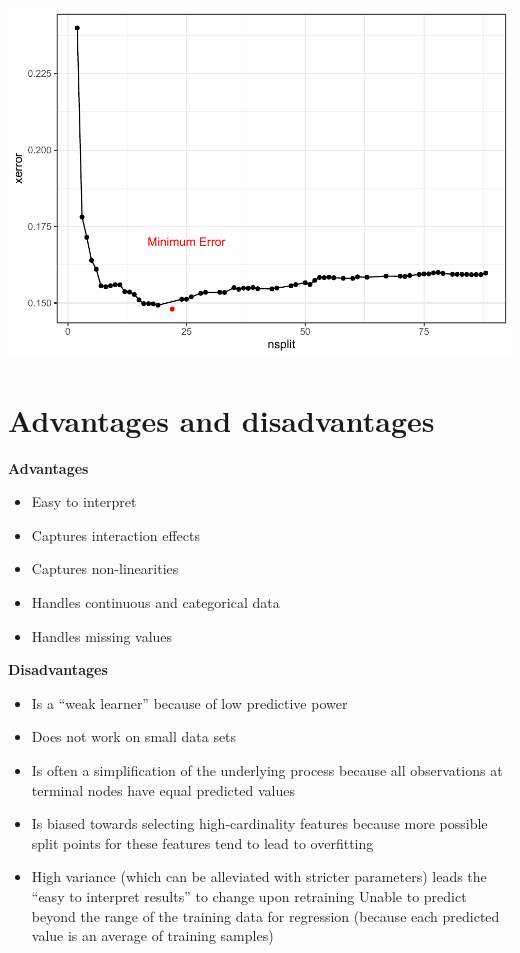 \documentclass[]{book}
\providecommand{\tightlist}{%
  \setlength{\itemsep}{0pt}\setlength{\parskip}{0pt}}
\begin{document}
\includegraphics{Exam-PA-Study-Manual_files/figure-latex/unnamed-chunk-121-1.pdf}

\hypertarget{advantages-and-disadvantages-2}{%
\section{Advantages and disadvantages}\label{advantages-and-disadvantages-2}}

\textbf{Advantages}

\begin{itemize}
\tightlist
\item
  Easy to interpret
\item
  Captures interaction effects
\item
  Captures non-linearities
\item
  Handles continuous and categorical data
\item
  Handles missing values
\end{itemize}

\textbf{Disadvantages}

\begin{itemize}
\tightlist
\item
  Is a ``weak learner'' because of low predictive power
\item
  Does not work on small data sets
\item
  Is often a simplification of the underlying process because all observations at terminal nodes have equal predicted values
\item
  Is biased towards selecting high-cardinality features because more possible split points for these features tend to lead to overfitting
\item
  High variance (which can be alleviated with stricter parameters) leads the ``easy to interpret results'' to change upon retraining
  Unable to predict beyond the range of the training data for regression (because each predicted value is an average of training samples)
\end{itemize}
\end{document}
